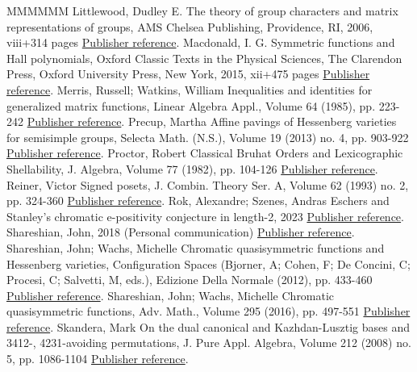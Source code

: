\begin{thebibliography}{MMMMMM}
 Littlewood, Dudley E. The theory of group characters and matrix representations of groups, AMS Chelsea Publishing, Providence, RI, 2006, viii+314 pages \href{https://alco.centre-mersenne.org/articles/10.5802/alco.459/#LittlewoodTGC}{Publisher reference}.
 Macdonald, I. G. Symmetric functions and Hall polynomials, Oxford Classic Texts in the Physical Sciences, The Clarendon Press, Oxford University Press, New York, 2015, xii+475 pages \href{https://alco.centre-mersenne.org/articles/10.5802/alco.459/#M1}{Publisher reference}.
 Merris, Russell; Watkins, William Inequalities and identities for generalized matrix functions, Linear Algebra Appl., Volume 64 (1985), pp. 223-242 \href{https://alco.centre-mersenne.org/articles/10.5802/alco.459/#MerWatIneq}{Publisher reference}.
 Precup, Martha Affine pavings of Hessenberg varieties for semisimple groups, Selecta Math. (N.S.), Volume 19 (2013) no. 4, pp. 903-922 \href{https://alco.centre-mersenne.org/articles/10.5802/alco.459/#PrecupAffine}{Publisher reference}.
 Proctor, Robert Classical Bruhat Orders and Lexicographic Shellability, J. Algebra, Volume 77 (1982), pp. 104-126 \href{https://alco.centre-mersenne.org/articles/10.5802/alco.459/#ProctorBruhat}{Publisher reference}.
 Reiner, Victor Signed posets, J. Combin. Theory Ser. A, Volume 62 (1993) no. 2, pp. 324-360 \href{https://alco.centre-mersenne.org/articles/10.5802/alco.459/#ReinerParset}{Publisher reference}.
 Rok, Alexandre; Szenes, Andras Eschers and Stanley’s chromatic e-positivity conjecture in length-2, 2023 \href{https://alco.centre-mersenne.org/articles/10.5802/alco.459/#RSEschers}{Publisher reference}.
 Shareshian, John, 2018 (Personal communication) \href{https://alco.centre-mersenne.org/articles/10.5802/alco.459/#ShareshianComm18}{Publisher reference}.
 Shareshian, John; Wachs, Michelle Chromatic quasisymmetric functions and Hessenberg varieties, Configuration Spaces (Bjorner, A; Cohen, F; De Concini, C; Procesi, C; Salvetti, M, eds.), Edizione Della Normale (2012), pp. 433-460 \href{https://alco.centre-mersenne.org/articles/10.5802/alco.459/#SWachsChromQ}{Publisher reference}.
 Shareshian, John; Wachs, Michelle Chromatic quasisymmetric functions, Adv. Math., Volume 295 (2016), pp. 497-551 \href{https://alco.centre-mersenne.org/articles/10.5802/alco.459/#SWachsChromQF}{Publisher reference}.
 Skandera, Mark On the dual canonical and Kazhdan-Lusztig bases and 3412-, 4231-avoiding permutations, J. Pure Appl. Algebra, Volume 212 (2008) no. 5, pp. 1086-1104 \href{https://alco.centre-mersenne.org/articles/10.5802/alco.459/#SkanNNDCB}{Publisher reference}.

\end{thebibliography}
